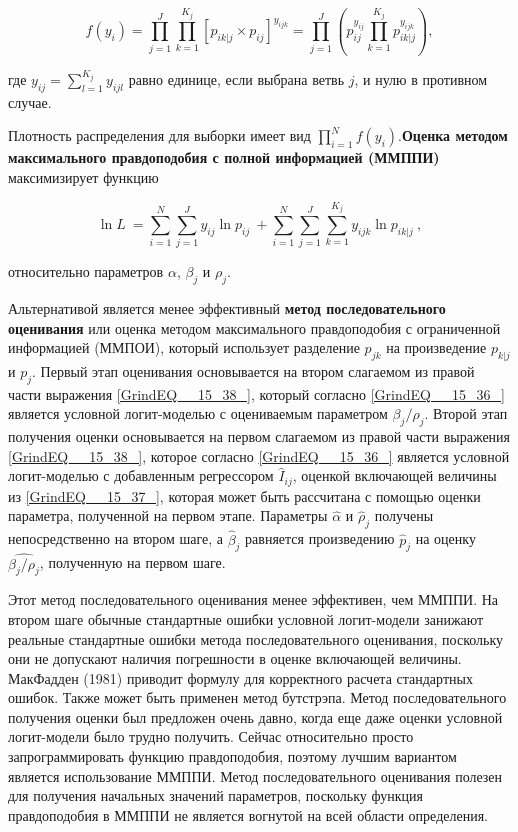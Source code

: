 \[f\left(y_i\right)=\prod^J_{j=1}{\prod^{K_j}_{k=1}{{\left[p_{ik|j}\times p_{ij}\right]}^{y_{ijk}}=\prod^J_{j=1}{\left(p^{y_{ij}}_{ij}\prod^{K_j}_{k = 1}{p^{y_{ijk}}_{ik|j}}\right)}},}\] 

где $y_{ij}=\sum^{K_j}_{l=1}{y_{ijl}}$ равно единице, если выбрана ветвь $j$, и нулю в противном случае.

Плотность распределения для выборки имеет вид $\prod^N_{i=1}{f\left(y_i\right).}$\textbf{Оценка методом максимального правдоподобия с полной информацией (ММППИ)} максимизирует функцию

\begin{equation} \label{GrindEQ__15_38_} {\ln  L\ }=\sum^N_{i=1}{\sum^J_{j=1}{y_{ij}{\ln  p_{ij}\ }}+\sum^N_{i=1}{\sum^J_{j=1}{\sum^{K_j}_{k=1}{y_{ijk}{\ln  p_{ik|j}\ }}}}}, \end{equation} 

относительно параметров $\alpha $, ${\beta }_j$ и ${\rho }_j.$

Альтернативой является менее эффективный \textbf{метод последовательного оценивания} или оценка методом максимального правдоподобия с ограниченной информацией (ММПОИ), который использует разделение $p_{jk}$ на произведение $p_{k|j}$ и $p_j$. Первый этап оценивания основывается на втором слагаемом из правой части выражения \eqref{GrindEQ__15_38_}, который согласно \eqref{GrindEQ__15_36_} является условной логит-моделью с оцениваемым параметром ${\beta }_j/{\rho }_j.$ Второй этап получения оценки основывается на первом слагаемом из правой части выражения \eqref{GrindEQ__15_38_}, которое согласно \eqref{GrindEQ__15_36_} является условной логит-моделью с добавленным регрессором ${\hat{I}}_{ij}$, оценкой включающей величины из \eqref{GrindEQ__15_37_}, которая может быть рассчитана с помощью оценки параметра, полученной на первом этапе. Параметры $\widehat{\alpha }$ и ${\widehat{\rho }}_j$ получены непосредственно на втором шаге, а ${\widehat{\beta }}_j$ равняется произведению ${\hat{p}}_j$ на оценку $\widehat{{\beta }_j/{\rho }_j}$, полученную на первом шаге.

Этот метод последовательного оценивания менее эффективен, чем ММППИ. На втором шаге обычные стандартные ошибки условной логит-модели занижают реальные стандартные ошибки метода последовательного оценивания, поскольку они не допускают наличия погрешности в оценке включающей величины. МакФадден (1981) приводит формулу для корректного расчета стандартных ошибок. Также может быть применен метод бутстрэпа. Метод последовательного получения оценки был предложен очень давно, когда еще даже оценки условной логит-модели было трудно получить. Сейчас относительно просто запрограммировать функцию правдоподобия, поэтому лучшим вариантом является использование ММППИ. Метод последовательного оценивания полезен для получения начальных значений параметров, поскольку функция правдоподобия в ММППИ не является вогнутой на всей области определения.

